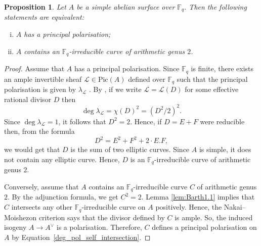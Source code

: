 \documentclass[11pt]{amsart}
\newcommand\Fq{\mathbb{F}_q}
\theoremstyle{plain}
\newtheorem{proposition}[theorem]{Proposition}
\theoremstyle{definition}
\begin{document}
\begin{proposition}\label{prop:pp_iff_pa2}
    Let $A$ be a simple abelian surface over $\Fq$.
    Then the following statements are equivalent:
    \begin{enumerate}[(i)]
        \item\label{prop:pp_iff_pa2:pp} $A$ has a principal polarisation;
        \item\label{prop:pp_iff_pa2:pa2} $A$ contains an $\Fq$-irreducible curve of arithmetic genus $2$.
    \end{enumerate}
\end{proposition}
\begin{proof}
    Assume that $A$ has a principal polarisation.
    Since $\Fq$ is finite, there exists an ample invertible sheaf $\mathcal{L}\in\mathrm{Pic}(A)$ defined over $\Fq$ such that the principal polarisation is given by $\lambda_\mathcal{L}$ \cite[Remark 13.2]{CS86}.
    By \cite[p.~150]{M_AV70}, if we write $\mathcal{L}=\mathcal{L}(D)$ for some effective rational divisor $D$ then 
    \begin{equation}\label{deg_pol_self_intersection}
       \deg \lambda_\mathcal{L}= \chi(D)^2=(D^2/2)^2.
    \end{equation}
    Since $\deg \lambda_\mathcal{L}=1$, it follows that 
    $D^2=2$.
    Hence, if $D=E+F$ were reducible then, from the formula 
    \begin{equation}\label{eq:div_square} 
        D^2=E^2+F^2+2\cdot E.F,
    \end{equation}
    we would get that $D$ is the sum of two elliptic curves.
    Since $A$ is simple, it does not contain any elliptic curve.
    Hence, $D$ is an $\Fq$-irreducible curve of arithmetic genus $2$.

    Conversely, assume that $A$ contains an $\Fq$-irreducible curve $C$ of arithmetic genus $2$.
    By the adjunction formula, we get $C^2=2$.
    Lemma \ref{lem:Barth1.1} implies that $C$ intersects any other $\Fq$-irreducible curve on $A$ positively. Hence, the Nakai--Moishezon criterion \cite[Sec.~5, Thm.~1.10]{Hart} says that the divisor defined by $C$ is ample.
    So, the induced isogeny $A \to A^\vee$ is a polarisation.
    Therefore, $C$ defines a principal polarisation on $A$ by Equation~\eqref{deg_pol_self_intersection}.
\end{proof}
\end{document}
